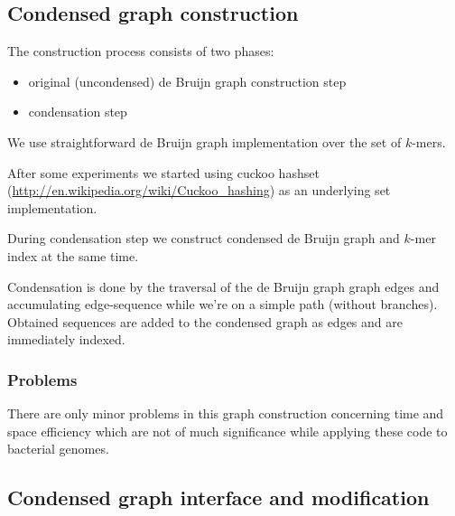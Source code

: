 \documentclass[12pt]{article}
\newcommand{\dbg}{de Bruijn graph}
\begin{document}
\subsection{Condensed graph construction}
The construction process consists of two phases:
\begin{itemize}
\item original (uncondensed) \dbg{} construction step
\item condensation step
\end{itemize}

We use straightforward \dbg{} implementation over the set of $k$-mers. 

After some experiments we started using cuckoo hashset (\url{http://en.wikipedia.org/wiki/Cuckoo_hashing}) as an underlying set implementation.

During condensation step we construct condensed \dbg{} and $k$-mer index at the same time.

Condensation is done by the traversal of the \dbg{} graph edges and accumulating edge-sequence while we're on a simple path (without branches). Obtained sequences are added to the condensed graph as edges and are immediately indexed.


\subsubsection{Problems}
There are only minor problems in this graph construction concerning time and space efficiency which are not of much significance while applying these code to bacterial genomes. %


\subsection{Condensed graph interface and modification}
\end{document}
